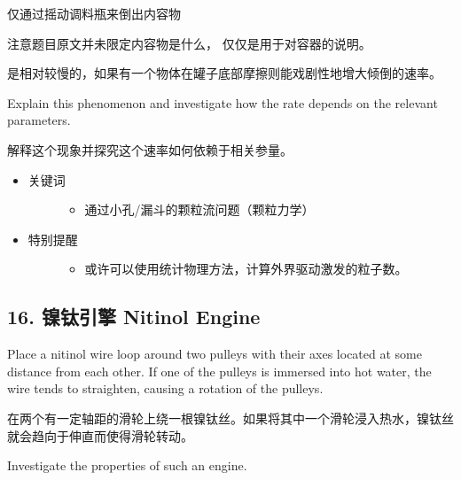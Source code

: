 \documentclass[a4paper,10pt,english]{sphinxmanual}
\begin{document}
仅通过摇动调料瓶来倒出内容物 %
\begin{footnote}[11]\sphinxAtStartFootnote
注意题目原文并未限定内容物是什么，  仅仅是用于对容器的说明。
%
\end{footnote} 是相对较慢的，如果有一个物体在罐子底部摩擦则能戏剧性地增大倾倒的速率。

Explain this phenomenon and investigate how the rate depends on the relevant parameters.

解释这个现象并探究这个速率如何依赖于相关参量。
\begin{itemize}
\item {} \begin{description}
\item[{关键词}] \leavevmode\begin{itemize}
\item {} 
通过小孔/漏斗的颗粒流问题（颗粒力学）

\end{itemize}

\end{description}

\item {} \begin{description}
\item[{特别提醒}] \leavevmode\begin{itemize}
\item {} 
或许可以使用统计物理方法，计算外界驱动激发的粒子数。

\end{itemize}

\end{description}

\end{itemize}


\subsection{16. 镍钛引擎 Nitinol Engine}
\label{\detokenize{7. Appendix:nitinol-engine}}
Place a nitinol wire loop around two pulleys with their axes located at some distance from each other. If one of the pulleys is immersed into hot water, the wire tends to straighten, causing a rotation of the pulleys.

在两个有一定轴距的滑轮上绕一根镍钛丝。如果将其中一个滑轮浸入热水，镍钛丝就会趋向于伸直而使得滑轮转动。

Investigate the properties of such an engine.
\end{document}
